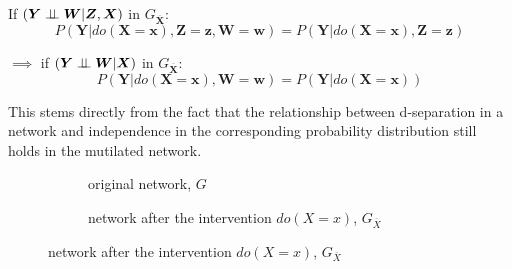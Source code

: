 \documentclass[11pt,a4paper]{article}
\begin{document}
If $(\boldsymbol{Y} \perp\!\!\!\perp \boldsymbol{W} | \boldsymbol{Z},\boldsymbol{X})$ in $G_{\overline{\boldsymbol{X}}}$:
\begin{equation}
\label{eq:Do1}
 P(\boldsymbol{Y}|do(\boldsymbol{X}=\boldsymbol{x}),\boldsymbol{Z}=\boldsymbol{z},\boldsymbol{W}=\boldsymbol{w}) = P(\boldsymbol{Y}|do(\boldsymbol{X}=\boldsymbol{x}),\boldsymbol{Z}=\boldsymbol{z}) 
\end{equation}

$\implies$ if $(\boldsymbol{Y} \perp\!\!\!\perp \boldsymbol{W} | \boldsymbol{X})$ in $G_{\overline{\boldsymbol{X}}}$:
\begin{equation}
\label{eq:Do12}
 P(\boldsymbol{Y}|do(\boldsymbol{X}=\boldsymbol{x}),\boldsymbol{W}=\boldsymbol{w}) = P(\boldsymbol{Y}|do(\boldsymbol{X}=\boldsymbol{x})) 
\end{equation}

This stems directly from the fact that the relationship between d-separation in a network and independence in the corresponding probability distribution still holds in the mutilated network. 

\begin{figure}[h]
\centering
\caption{Intervention in a causal bayesian network}
\label{fig:mutilatednet}
\begin{subfigure}[t]{0.3\textwidth}
\centering
\caption{original network, $G$}
\label{fig:mutilatedOriginal}
\end{subfigure}
\begin{subfigure}[t]{0.5\textwidth}
\centering
\caption{network after the intervention $do(X=x)$, $G_{\overline{X}}$}
\label{fig:mutilatedAfter}
\end{subfigure}
\end{figure}
\end{document}
